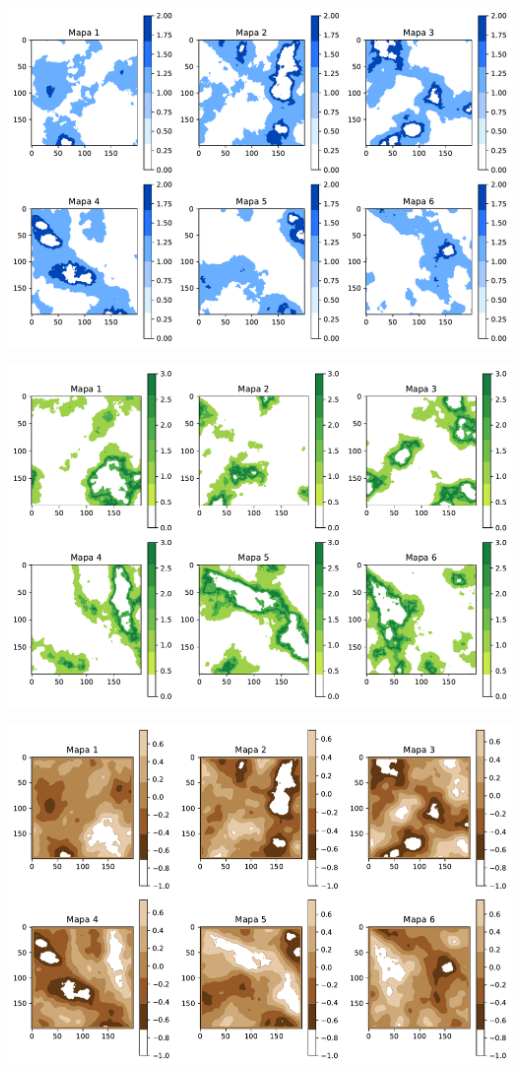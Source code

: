 \documentclass[
  letterpaper,
  DIV=11,
  numbers=noendperiod]{scrartcl}
\begin{document}
\includegraphics{MCA_files/figure-pdf/cell-8-output-3.pdf}

\includegraphics{MCA_files/figure-pdf/cell-8-output-4.pdf}

\includegraphics{MCA_files/figure-pdf/cell-8-output-5.pdf}
\end{document}
